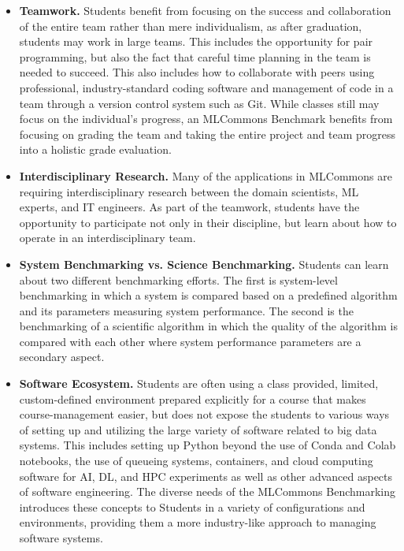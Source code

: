 \documentclass[utf8]{FrontiersinVancouver} %
\begin{document}
\begin{itemize}


\item {\bf Teamwork.} Students benefit from focusing on the success
  and collaboration of the entire team rather than mere individualism,
  as after graduation, students may work in large teams. This includes
  the opportunity for pair programming, but also the fact that careful
  time planning in the team is needed to succeed. This also includes
  how to collaborate with peers using professional, industry-standard
  coding software and management of code in a team through a
  version control system such as Git. While classes still may focus on the
  individual's progress, an MLCommons Benchmark benefits from focusing
  on grading the team and taking the entire project and team progress
  into a holistic grade evaluation.

  \item {\bf Interdisciplinary Research.} Many of the applications in
    MLCommons are requiring interdisciplinary research between the domain
    scientists, ML experts, and IT engineers. As part of the teamwork,
    students have the opportunity to participate not only in their
    discipline, but learn about how to operate in an interdisciplinary
    team.

  \item {\bf System Benchmarking vs. Science Benchmarking.} Students
    can learn about two different benchmarking efforts. The first is
    system-level benchmarking in which a system is compared based
    on a predefined algorithm and its parameters measuring system performance. The second is the
    benchmarking of a scientific algorithm in which the quality of the
    algorithm is compared with each other where system performance parameters are a secondary aspect.

  \item {\bf Software Ecosystem.} Students are often using a class provided,
    limited, custom-defined environment prepared explicitly for a course that makes
    course-management easier, but does not expose the students
    to various ways of setting up and utilizing the large variety of
    software related to big data systems. This includes setting up
    Python beyond the use of Conda and Colab notebooks, the use of
    queueing systems, containers, and cloud computing software for
    AI, DL, and HPC experiments as well as other advanced aspects of
    software engineering.  The diverse needs of the MLCommons Benchmarking
    introduces these concepts to Students in a variety of configurations
    and environments, providing them a more industry-like approach to
    managing software systems.


\end{itemize}
\end{document}
